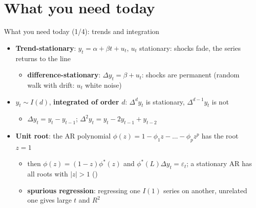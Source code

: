 \section{What you need today}

\begin{frame}{What you need today (1/4): trends and integration}
\itemsize{\small}
\begin{itemize}
    \item \textbf{Trend-stationary}: $y_t = \alpha + \beta t + u_t$, $u_t$ stationary: shocks fade, the series returns to the line
    \begin{itemize}
        \item \textbf{difference-stationary}: $\Delta y_t = \beta + u_t$: shocks are permanent (random walk with drift: $u_t$ white noise)
    \end{itemize}
    \item $y_t \sim I(d)$, \textbf{integrated of order $d$}: $\Delta^d y_t$ is stationary, $\Delta^{d-1}y_t$ is not
    \begin{itemize}
        \item $\Delta y_t = y_t - y_{t-1}$; $\Delta^2 y_t = y_t - 2y_{t-1} + y_{t-2}$
    \end{itemize}
    \item \textbf{Unit root}: the AR polynomial $\phi(z) = 1 - \phi_1 z - \dots - \phi_p z^p$ has the root $z = 1$
    \begin{itemize}
        \item then $\phi(z) = (1 - z)\phi^*(z)$ and $\phi^*(L)\Delta y_t = \varepsilon_t$; a stationary AR has all roots with $|z| > 1$ ()
        \item \textbf{spurious regression}: regressing one $I(1)$ series on another, unrelated one gives large $t$ and $R^2$
    \end{itemize}
\end{itemize}
\end{frame}

